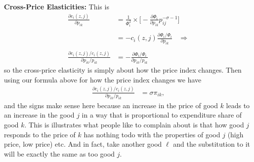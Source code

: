 \documentclass[pdftex,11pt]{article}
\begin{document}
\textbf{Cross-Price Elasticities:} This is
\begin{align}
 \frac{\partial c_{i}(z,j) }{\partial p_{ik}} &= \frac{1}{\Phi_i^2} \times \Bigg [ - \frac{\partial \Phi_{i}}{\partial p_{ik}} p_{ij}^{-\sigma - 1} \Bigg ] \\
 \nonumber \\
&= - c_{i}(z,j)\frac{\partial \Phi_{i} / \Phi_{i}}{\partial p_{ik}} \ \ \ \ \Rightarrow \\
\nonumber \\
 \frac{\partial c_{i}(z,j)/ c_{i}(z,j)}{\partial p_{ik} / p_{ik}}  &= - \frac{\partial \Phi_{i} / \Phi_{i} }{\partial p_{ik}/ p_{ik}}
\end{align}
so the cross-price elasticity is simply about how the price index changes. Then using our formula above for how the price index changes we have
\begin{align}
 \frac{\partial c_{i}(z,j)/ c_{i}(z,j)}{\partial p_{ik} / p_{ik}}  &= \sigma \pi_{ik},
\end{align}
and the signs make sense here because an increase in the price of good $k$ leads to an increase in the good $j$ in a way that is proportional to expenditure share of good $k$. This is illustrates what people like to complain about is that how good $j$ responds to the price of $k$ has nothing todo with the properties of good $j$ (high price, low price) etc. And in fact, take another good $\ell$ and the substitution to it will be exactly the same as too good $j$. 
\end{document}
